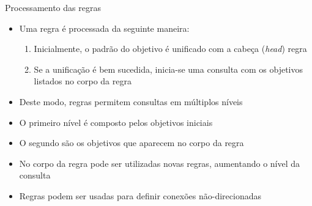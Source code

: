 \begin{frame}[fragile]{Processamento das regras}

    \begin{itemize}
        \item Uma regra é processada da seguinte maneira:

        \begin{enumerate}
            \item Inicialmente, o padrão do objetivo é unificado com a cabeça (\textit{head}) 
                regra
            \item Se a unificação é bem sucedida, inicia-se uma consulta com os objetivos 
                listados no corpo da regra
        \end{enumerate}

        \item Deste modo, regras permitem consultas em múltiplos níveis
        
        \item O primeiro nível é composto pelos objetivos iniciais

        \item O segundo são os objetivos que aparecem no corpo da regra

        \item No corpo da regra pode ser utilizadas novas regras, aumentando o nível da 
            consulta

        \item Regras podem ser usadas para definir conexões não-direcionadas

    \end{itemize}

\end{frame}

